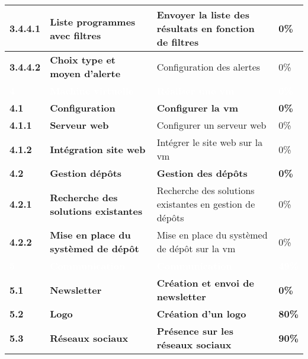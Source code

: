 \begin{supertabular}{|p{2.8cm} p{6cm}|p{5cm}|R{2cm}|}
  \hspace{12pt}
  \textbf{3.4.4.1}  & \textbf{Liste programmes avec filtres} & Envoyer la liste des résultats en fonction de filtres & 0\% \\
  \hline

  \hspace{12pt}
  \textbf{3.4.4.2}  & \textbf{Choix type et moyen d'alerte} & Configuration des alertes & 0\% \\
  \hline





  \textcolor{white}{\textbf{4}}  & \textcolor{white}{\textbf{Machine virtuelle}} & \textcolor{white}{\textbf{Réaliser une vm}} & \textcolor{white}{\textbf{0\%}} \\
  \hline

  \textbf{4.1}  & \textbf{Configuration} & \textbf{Configurer la vm} & \textbf{0\%} \\
  \hline

  \hspace{6pt}
  \textbf{4.1.1}  & \textbf{Serveur web} & Configurer un serveur web & 0\% \\
  \hline

  \hspace{6pt}
  \textbf{4.1.2}  & \textbf{Intégration site web} & Intégrer le site web sur la vm & 0\% \\
  \hline

  \textbf{4.2}  & \textbf{Gestion dépôts} & \textbf{Gestion des dépôts} & \textbf{0\%} \\
  \hline


  \hspace{6pt}
  \textbf{4.2.1}  & \textbf{Recherche des solutions existantes} & Recherche des solutions existantes en gestion de dépôts & 0\% \\
  \hline

  \hspace{6pt}
  \textbf{4.2.2}  & \textbf{Mise en place du systèmed de dépôt} &  Mise en place du systèmed de dépôt sur la vm & 0\% \\
  \hline


  \textcolor{white}{\textbf{5}}  & \textcolor{white}{\textbf{Communication}} & \textcolor{white}{\textbf{Communication}} & \textcolor{white}{\textbf{49\%}} \\
  \hline

  \textbf{5.1}  & \textbf{Newsletter} & \textbf{Création et envoi de newsletter} & \textbf{0\%} \\
  \hline

  \textbf{5.2}  & \textbf{Logo} & \textbf{Création d'un logo} & \textbf{80\%} \\
  \hline

  \textbf{5.3}  & \textbf{Réseaux sociaux} & \textbf{Présence sur les réseaux sociaux} & \textbf{90\%} \\
  \hline



\end{supertabular}
\normalsize
